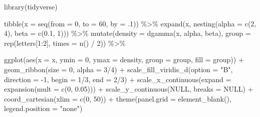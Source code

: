 \documentclass[]{tufte-handout}
\newenvironment{Shaded}{}{}
\newcommand{\AttributeTok}[1]{\textcolor[rgb]{0.49,0.56,0.16}{#1}}
\newcommand{\ConstantTok}[1]{\textcolor[rgb]{0.53,0.00,0.00}{#1}}
\newcommand{\DecValTok}[1]{\textcolor[rgb]{0.25,0.63,0.44}{#1}}
\newcommand{\FloatTok}[1]{\textcolor[rgb]{0.25,0.63,0.44}{#1}}
\newcommand{\FunctionTok}[1]{\textcolor[rgb]{0.02,0.16,0.49}{#1}}
\newcommand{\NormalTok}[1]{#1}
\newcommand{\SpecialCharTok}[1]{\textcolor[rgb]{0.25,0.44,0.63}{#1}}
\newcommand{\StringTok}[1]{\textcolor[rgb]{0.25,0.44,0.63}{#1}}
\begin{document}
\begin{Shaded}
\begin{Highlighting}[]
\FunctionTok{library}\NormalTok{(tidyverse)}

\FunctionTok{tibble}\NormalTok{(}\AttributeTok{x =} \FunctionTok{seq}\NormalTok{(}\AttributeTok{from =} \DecValTok{0}\NormalTok{, }\AttributeTok{to =} \DecValTok{60}\NormalTok{, }\AttributeTok{by =}\NormalTok{ .}\DecValTok{1}\NormalTok{)) }\SpecialCharTok{\%\textgreater{}\%} 
  \FunctionTok{expand}\NormalTok{(x, }\FunctionTok{nesting}\NormalTok{(}\AttributeTok{alpha =} \FunctionTok{c}\NormalTok{(}\DecValTok{2}\NormalTok{, }\DecValTok{4}\NormalTok{), }
                    \AttributeTok{beta  =} \FunctionTok{c}\NormalTok{(}\FloatTok{0.1}\NormalTok{, }\DecValTok{1}\NormalTok{))) }\SpecialCharTok{\%\textgreater{}\%} 
  \FunctionTok{mutate}\NormalTok{(}\AttributeTok{density =} \FunctionTok{dgamma}\NormalTok{(x, alpha, beta),}
         \AttributeTok{group   =} \FunctionTok{rep}\NormalTok{(letters[}\DecValTok{1}\SpecialCharTok{:}\DecValTok{2}\NormalTok{], }\AttributeTok{times =} \FunctionTok{n}\NormalTok{() }\SpecialCharTok{/} \DecValTok{2}\NormalTok{)) }\SpecialCharTok{\%\textgreater{}\%} 
  
  \FunctionTok{ggplot}\NormalTok{(}\FunctionTok{aes}\NormalTok{(}\AttributeTok{x =}\NormalTok{ x, }\AttributeTok{ymin =} \DecValTok{0}\NormalTok{, }\AttributeTok{ymax =}\NormalTok{ density, }
             \AttributeTok{group =}\NormalTok{ group, }\AttributeTok{fill =}\NormalTok{ group)) }\SpecialCharTok{+}
  \FunctionTok{geom\_ribbon}\NormalTok{(}\AttributeTok{size =} \DecValTok{0}\NormalTok{, }\AttributeTok{alpha =} \DecValTok{3}\SpecialCharTok{/}\DecValTok{4}\NormalTok{) }\SpecialCharTok{+}
  \FunctionTok{scale\_fill\_viridis\_d}\NormalTok{(}\AttributeTok{option =} \StringTok{"B"}\NormalTok{, }\AttributeTok{direction =} \SpecialCharTok{{-}}\DecValTok{1}\NormalTok{, }
                       \AttributeTok{begin =} \DecValTok{1}\SpecialCharTok{/}\DecValTok{3}\NormalTok{, }\AttributeTok{end =} \DecValTok{2}\SpecialCharTok{/}\DecValTok{3}\NormalTok{) }\SpecialCharTok{+}
  \FunctionTok{scale\_x\_continuous}\NormalTok{(}\AttributeTok{expand =} \FunctionTok{expansion}\NormalTok{(}\AttributeTok{mult =} \FunctionTok{c}\NormalTok{(}\DecValTok{0}\NormalTok{, }\FloatTok{0.05}\NormalTok{))) }\SpecialCharTok{+}
  \FunctionTok{scale\_y\_continuous}\NormalTok{(}\ConstantTok{NULL}\NormalTok{, }\AttributeTok{breaks =} \ConstantTok{NULL}\NormalTok{) }\SpecialCharTok{+}
  \FunctionTok{coord\_cartesian}\NormalTok{(}\AttributeTok{xlim =} \FunctionTok{c}\NormalTok{(}\DecValTok{0}\NormalTok{, }\DecValTok{50}\NormalTok{)) }\SpecialCharTok{+}
  \FunctionTok{theme}\NormalTok{(}\AttributeTok{panel.grid =} \FunctionTok{element\_blank}\NormalTok{(),}
        \AttributeTok{legend.position =} \StringTok{"none"}\NormalTok{)}
\end{Highlighting}
\end{Shaded}
\end{document}
